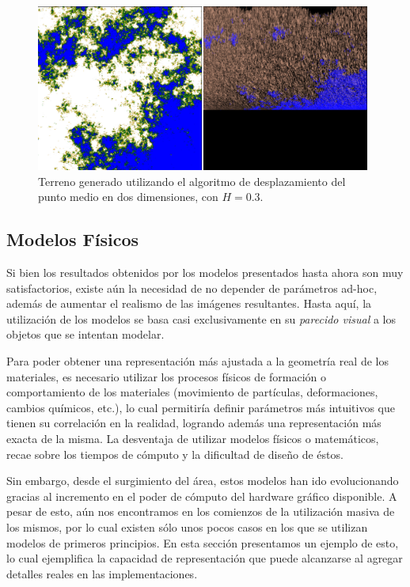 \begin{figure}
\center
\includegraphics[width=11cm]{figures/terreno2}
\caption[Terreno generado utilizando el algoritmo de desplazamiento del punto medio en dos dimensiones, con $H = 0.3$]{Terreno generado utilizando el algoritmo de desplazamiento del punto medio en dos dimensiones, con $H = 0.3$.}
\label{fg:terreno2}
\end{figure}



\subsection{Modelos Físicos}
Si bien los resultados obtenidos por los modelos presentados hasta ahora son muy satisfactorios, existe aún la necesidad de no depender de parámetros ad-hoc, además de aumentar el realismo de las imágenes resultantes.
Hasta aquí, la utilización de los modelos se basa casi exclusivamente en su {\em parecido visual} a los objetos que se intentan modelar.

Para poder obtener una representación más ajustada a la geometría real de los materiales, es necesario utilizar los procesos físicos de formación o comportamiento de los materiales (movimiento de partículas, deformaciones, cambios químicos, etc.), lo cual permitiría definir parámetros más intuitivos que tienen su correlación en la realidad, logrando además una representación más exacta de la misma.
La desventaja de utilizar modelos físicos o matemáticos, recae sobre los tiempos de cómputo y la dificultad de diseño de éstos.

Sin embargo, desde el surgimiento del área, estos modelos han ido evolucionando gracias al incremento en el poder de cómputo del hardware gráfico disponible. A pesar de esto, aún nos encontramos en los comienzos de la utilización masiva de los mismos, por lo cual existen sólo unos pocos casos en los que se utilizan modelos de primeros principios.
En esta sección presentamos un ejemplo de esto, lo cual ejemplifica la capacidad de representación que puede alcanzarse al agregar detalles reales en las implementaciones.

